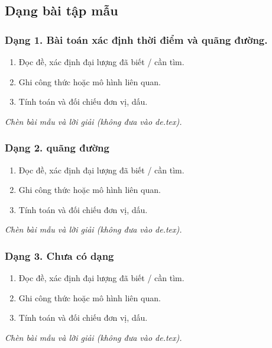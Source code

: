 

\subsection{Dạng bài tập mẫu}
\subsubsection{Dạng 1. Bài toán xác định thời điểm và quãng đường.}
\begin{phuongphap}
\begin{enumerate}
\item Đọc đề, xác định đại lượng đã biết / cần tìm.
\item Ghi công thức hoặc mô hình liên quan.
\item Tính toán và đối chiếu đơn vị, dấu.
\end{enumerate}
\end{phuongphap}
\begin{vidumau}
\textit{Chèn bài mẫu và lời giải (không đưa vào de.tex).}
\end{vidumau}

\subsubsection{Dạng 2. quãng đường}
\begin{phuongphap}
\begin{enumerate}
\item Đọc đề, xác định đại lượng đã biết / cần tìm.
\item Ghi công thức hoặc mô hình liên quan.
\item Tính toán và đối chiếu đơn vị, dấu.
\end{enumerate}
\end{phuongphap}
\begin{vidumau}
\textit{Chèn bài mẫu và lời giải (không đưa vào de.tex).}
\end{vidumau}

\subsubsection{Dạng 3. Chưa có dạng}
\begin{phuongphap}
\begin{enumerate}
\item Đọc đề, xác định đại lượng đã biết / cần tìm.
\item Ghi công thức hoặc mô hình liên quan.
\item Tính toán và đối chiếu đơn vị, dấu.
\end{enumerate}
\end{phuongphap}
\begin{vidumau}
\textit{Chèn bài mẫu và lời giải (không đưa vào de.tex).}
\end{vidumau}

